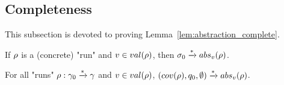 \subsection{Completeness}
\label{one-completeness}

This subsection is devoted to proving Lemma~\ref{lem:abstraction_complete}.

\begin{lemma}
	\label{lem:abstraction_complete}
	If $\rho$ is a (concrete) "run" and $\aval \in \valsof{\run}$, then $\aconfiginit \step{*} \absproj{\aval}{\run}$. 
\end{lemma}



\begin{lemma}
	\label{lem:proof_completeness_covset_constant}
	For all "runs" $\rho: \gamma_0 \xrightarrow{*} \gamma$ and $\aval \in \valsof{\run}$, $(\statesin{\run}, q_0, \emptyset) \step{*} \absproj{\aval}{\run}$. 
\end{lemma}

